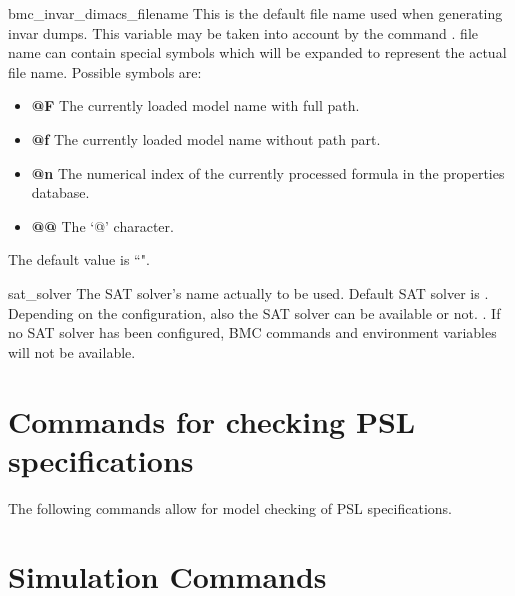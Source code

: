 \begin{nusmvVar} {bmc\_invar\_dimacs\_filename}{}{}
This is the default file name used when generating \dimacs invar
dumps. This variable may be taken into account by the command
.  \dimacs file name can contain special symbols which will
be expanded to represent the actual file name. Possible symbols are:
\begin{itemize}
\item {\bf @F}
The currently loaded model name with full path.
\item {\bf @f}
The currently loaded model name without path part.
\item {\bf @n}
The numerical index of the currently processed formula in the properties
database.
\item {\bf @@}
The `@' character.
\end{itemize}
The default value is ``".\\
\end{nusmvVar}

\begin{nusmvVar} {sat\_solver}{}{\minisat}
The SAT solver's name actually to be used. Default SAT solver
is \minisat.  Depending on the \nusmv configuration, also the \zchaff
SAT solver can be available or not. \zchaffminisatnotice. If no SAT
solver has been configured, BMC commands and environment variables
will not be available.
\end{nusmvVar}



\section{Commands for checking PSL specifications}
\label{Commands for checking PSL specifications}

The following commands allow for model checking of PSL specifications.








\section{Simulation Commands}
\label{Simulation Commands}

